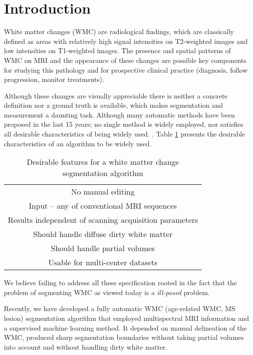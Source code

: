 \section{Introduction} \label{intro}


White matter changes (WMC) are radiological findings, which are classically defined as areas with relatively high signal intensities on T2-weighted images and low intensities on T1-weighted images. The presence and spatial patterns of WMC on MRI and the appearance of these changes are possible key components for studying this pathology and for prospective clinical practice (diagnosis, follow progression, monitor treatments).

Although these changes are visually appreciable there is neither a concrete definition nor a ground truth is available, which makes segmentation and measurement a daunting task. Although many automatic methods have been proposed in the last 15 years; no single method is widely employed, nor satisfies all desirable characteristics of being widely used. \cite{GarciaReview}. Table \ref{Table:Requirements} presents the desirable characteristics of an algorithm to be widely used.

\begin{table}
\centering
    \begin{tabular}  {  c }
    \hline
        No manual editing \\ 
        Input – any of conventional MRI sequences \\ 
        Results independent of scanning acquisition parameters \\ 
        Should handle diffuse dirty white matter \\ 
        Should handle partial volumes \\ 
        Usable for multi-center datasets \\
    \hline
    \end{tabular} 
    \caption{Desirable features for a white matter change segmentation algorithm } 
    \label{Table:Requirements}
\end{table}
    
We believe failing to address all these specification rooted in the fact that the problem of segmenting WMC as viewed today is a \textit{ill-posed} problem\cite{IllPosed}.

Recently, we have developed a fully automatic WMC (age-related WMC, MS lesion) segmentation algorithm \cite{CascadeOrig} that employed multispectral MRI information and a supervised machine learning method. It depended on manual delineation of the WMC, produced sharp segmentation boundaries without taking partial volumes into account and without handling dirty white matter.
    

